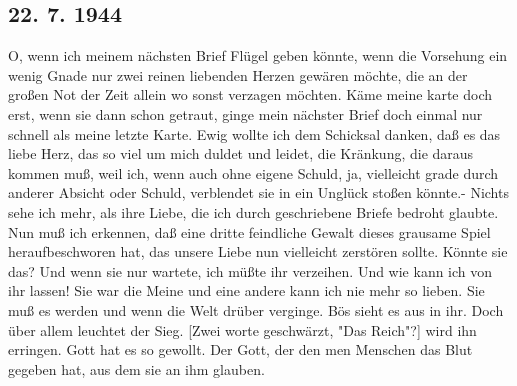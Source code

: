 \subsection{22. 7. 1944}

O, wenn ich meinem n\"{a}chsten Brief Fl\"{u}gel geben k\"{o}nnte, wenn die Vorsehung ein wenig Gnade nur zwei reinen liebenden Herzen gew\"{a}ren m\"{o}chte, die an der gro{\ss}en Not der Zeit allein wo sonst verzagen m\"{o}chten.
K\"{a}me meine karte doch erst, wenn sie dann schon getraut, ginge mein n\"{a}chster Brief doch einmal nur schnell als meine letzte Karte.
Ewig wollte ich dem Schicksal danken, da{\ss} es das liebe Herz, das so viel um mich duldet und leidet, die Kr\"{a}nkung, die daraus kommen mu{\ss}, weil ich, wenn auch ohne eigene Schuld, ja, vielleicht grade durch anderer Absicht oder Schuld, verblendet sie in ein Ungl\"{u}ck sto{\ss}en k\"{o}nnte.-
Nichts sehe ich mehr, als ihre Liebe, die ich durch geschriebene Briefe bedroht glaubte.
Nun mu{\ss} ich erkennen, da{\ss} eine dritte feindliche Gewalt dieses grausame Spiel heraufbeschworen hat, das unsere Liebe nun vielleicht zerst\"{o}ren sollte.
K\"{o}nnte sie das?
Und wenn sie nur wartete, ich m\"{u}{\ss}te ihr verzeihen.
Und wie kann ich von ihr lassen!
Sie war die Meine und eine andere kann ich nie mehr so lieben.
Sie mu{\ss} es werden und wenn die Welt dr\"{u}ber verginge.
B\"{o}s sieht es aus in ihr.
Doch \"{u}ber allem leuchtet der Sieg.
{\color{red} [Zwei worte geschw\"{a}rzt, "Das Reich"?] } wird ihn erringen.
Gott hat es so gewollt.
Der Gott, der den men Menschen das Blut gegeben hat, aus dem sie an ihm glauben.

\clearpage
